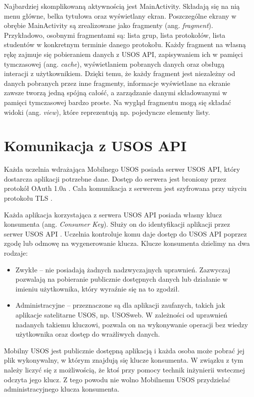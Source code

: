 \documentclass{pracamgr}
\begin{document}
Najbardziej skomplikowaną aktywnością jest MainActivity. Składają się na nią
menu główne, belka tytułowa oraz wyświetlany ekran. Poszczególne ekrany w obrębie
MainActivity są zrealizowane jako fragmenty (ang. \textit{fragment}). Przykładowo,
osobnymi fragmentami są: lista grup, lista protokołów, lista studentów w konkretnym
terminie danego protokołu. Każdy fragment na własną rękę zajmuje się pobieraniem
danych z USOS API, zapisywaniem ich w pamięci tymczasowej (ang. \textit{cache}),
wyświetlaniem pobranych danych oraz obsługą interacji z użytkownikiem. Dzięki temu,
że każdy fragment jest niezależny od danych pobranych przez inne fragmenty, informacje
wyświetlane na ekranie zawsze tworzą jedną spójną całość, a zarządzanie danymi
składowanymi w pamięci tymczasowej bardzo proste. Na wygląd fragmentu mogą się
składać widoki (ang. \textit{view}), które reprezentują np. pojedyncze elementy
listy.

\section{Komunikacja z USOS API}

Każda uczelnia wdrażająca Mobilnego USOS posiada serwer USOS API, który dostarcza
aplikacji potrzebne dane. Dostęp do serwera jest broniony przez protokół
OAuth 1.0a \cite{oauth}. Cała komunikacja z serwerem jest szyfrowana przy użyciu
protokołu TLS \cite{tls12}.

Każda aplikacja korzystająca z serwera USOS API posiada własny klucz konsumenta
(ang. \textit{Consumer Key}). Służy on do identyfikacji aplikacji przez serwer
USOS API \cite{usosapi-auth}. Uczelnia kontroluje komu daje dostęp do USOS API
poprzez zgodę lub odmowę na wygenerowanie klucza. Klucze konsumenta dzielimy na
dwa rodzaje:
\begin{itemize}
	\item Zwykłe -- nie posiadają żadnych nadzwyczajnych uprawnień. Zazwyczaj
	pozwalają na pobieranie publicznie dostępnych danych lub działanie w imieniu
	użytkownika, który wyraźnie się na to zgodził.
	\item Administracyjne -- przeznaczone są dla aplikacji zaufanych, takich jak
	aplikacje satelitarne USOS, np. USOSweb. W zależności od uprawnień nadanych
	takiemu kluczowi, pozwala on na wykonywanie operacji bez wiedzy użytkownika
	oraz dostęp do wrażliwych danych.
\end{itemize}
Mobilny USOS jest publicznie dostępną aplikacją i każda osoba może pobrać jej
plik wykonywalny, w którym znajdują się klucze konsumenta. W związku z tym należy
liczyć się z możliwością, że ktoś przy pomocy technik inżynierii wstecznej odczyta
jego klucz. Z tego powodu nie wolno Mobilnemu USOS przydzielać administracyjnego
klucza konsumenta.
\end{document}
